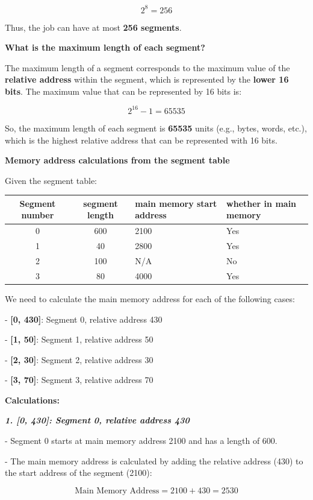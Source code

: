 \documentclass[a4paper]{book}
\begin{document}
\[
2^8 = 256
\]

Thus, the job can have at most \textbf{256 segments}.

\textbf{What is the maximum length of each segment?}

The maximum length of a segment corresponds to the maximum value of the \textbf{relative address} within the segment, which is represented by the \textbf{lower 16 bits}. The maximum value that can be represented by 16 bits is:

\[
2^{16} - 1 = 65535
\]

So, the maximum length of each segment is \textbf{65535} units (e.g., bytes, words, etc.), which is the highest relative address that can be represented with 16 bits.

\textbf{Memory address calculations from the segment table}

Given the segment table:

\vspace{0.5cm}
\begin{tabular}{|c|c|p{3cm}|p{3cm}|}
    \hline
    Segment number & segment length & main memory start address & whether in main memory \\ \hline
    0   & 600   & 2100 & Yes  \\  \hline
    1   & 40    & 2800 & Yes  \\  \hline
	2   & 100   & N/A  & No   \\  \hline
	3   & 80    & 4000 & Yes  \\  \hline
\end{tabular}

We need to calculate the main memory address for each of the following cases:

- \textbf{[0, 430]}: Segment 0, relative address 430

- \textbf{[1, 50]}: Segment 1, relative address 50

- \textbf{[2, 30]}: Segment 2, relative address 30

- \textbf{[3, 70]}: Segment 3, relative address 70

\textbf{Calculations:}

\textit{\textbf{1. \textbf{[0, 430]}: Segment 0, relative address 430}}

- Segment 0 starts at main memory address 2100 and has a length of 600.

- The main memory address is calculated by adding the relative address (430) to the start address of the segment (2100):
  
\[
\text{Main Memory Address} = 2100 + 430 = 2530
\]
\end{document}
